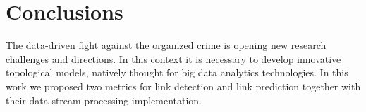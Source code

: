 \section{Conclusions}
\label{sec:conclusions}

The data-driven fight against the organized crime is opening new research challenges and directions. 
In this context it is necessary to develop innovative topological models, natively thought for big data analytics technologies.
In this work we proposed two metrics for link detection and link prediction together with their data stream processing implementation. 
